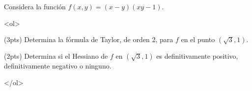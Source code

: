 \documentclass[12pt]{article}
\begin{document}
\bigskip

            
\bigskip
\bigskip
\bigskip


Considera la función $f(x,y)=(x-y)(xy-1)$.



<ol>

\item (3pts) Determina la fórmula de Taylor, de orden 2, para $f$
  en el punto $(\sqrt{3},1)$.



  \vspace{8cm}


\item (2pts) Determina si el Hessiano de $f$ en $(\sqrt{3},1)$ es
  definitivamente positivo, definitivamente negativo o ninguno.


  

</ol>
 





  
\end{document}
